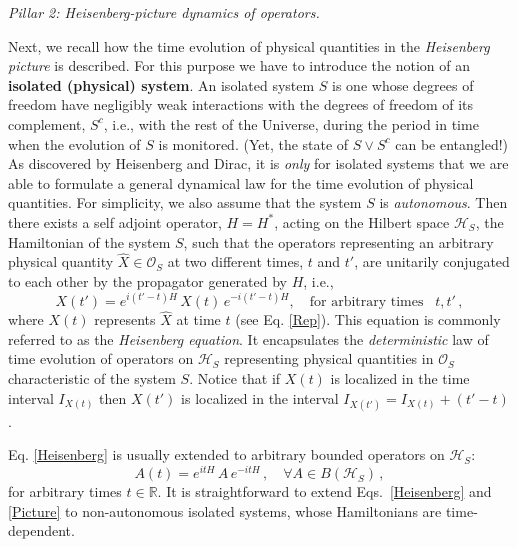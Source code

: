 \documentclass[12pt]{article}
\begin{document}
\textit{{Pillar 2}: Heisenberg-picture dynamics of operators.}

Next, we recall how the time evolution of physical quantities in the \textit{Heisenberg picture} is described.
For this purpose we have to introduce the notion of an {\bf{isolated (physical) system}}.
An isolated system $S$ is one whose degrees of freedom have negligibly weak interactions with the
degrees of freedom of its complement, $S^{c}$, i.e., with the rest of the Universe, during the period in
time when the evolution of $S$ is monitored. (Yet, the state of $S\vee S^{c}$ can be entangled!)
As discovered by {Heisenberg} and Dirac, it is \textit{only} for isolated systems that we are
able to formulate a general dynamical law for the time evolution of physical quantities. For simplicity, we also assume that the
system $S$ is \textit{autonomous}. Then there exists a self adjoint operator, $H=H^{*}$,
acting on the Hilbert space $\mathcal{H}_S$, the {Hamiltonian} of the system $S$, such that the operators representing an arbitrary physical quantity $\hat{X}\in \mathcal{O}_S$ at two different times, $t$ and $t'$, are unitarily conjugated to each other by the propagator generated by $H$, i.e.,
\begin{equation}\label{Heisenberg}
X(t') = e^{i(t'-t)H} \,X(t) \,e^{-i(t'-t)H}, \quad \text{for arbitrary times }\,\,\, t, t'\,,
\end{equation}
where $X(t)$ represents $\hat{X}$ at time $t$ (see Eq. \eqref{Rep}). This equation is
commonly referred to as the \textit{Heisenberg equation}. It encapsulates the \textit{deterministic} law of time evolution of
operators on $\mathcal{H}_S$ representing physical quantities in $\mathcal{O}_S$ characteristic of the system $S$.
Notice that if $X(t)$ is localized in the time interval $I_{X(t)}$ then $X(t')$ is localized in the interval $I_{X(t')}= I_{X(t)} +(t'-t)$.

Eq. \eqref{Heisenberg} is usually extended to arbitrary bounded operators on $\mathcal{H}_S$:
\begin{equation}\label{Picture}
A(t) = e^{itH} \, A \, e^{-itH}\,, \quad \forall A \in B(\mathcal{H}_S)\,,
\end{equation}
for arbitrary times $t \in \mathbb{R}$. It is straightforward to extend Eqs.~\eqref{Heisenberg} and \eqref{Picture} to
non-autonomous isolated systems, whose Hamiltonians are time-dependent.
\end{document}
